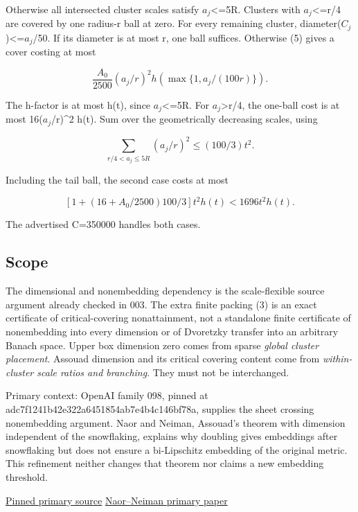\documentclass[
  11pt,
]{article}
\theoremstyle{remark}\newtheorem{remark}[theorem]{Remark}
\begin{document}
Otherwise all intersected cluster scales satisfy \(a_j\)\textless=5R.
Clusters with \(a_j\)\textless=r/4 are covered by one radius-r ball at
zero. For every remaining cluster,
diameter(\(C_j\))\textless=\(a_j\)/50. If its diameter is at most r, one
ball suffices. Otherwise (5) gives a cover costing at most

\[
\frac{A_0}{2500}(a_j/r)^2h(\max\{1,a_j/(100r)\}).
\]

The h-factor is at most h(t), since \(a_j\)\textless=5R. For
\(a_j\)\textgreater r/4, the one-ball cost is at most 16(\(a_j\)/r)\^{}2
h(t). Sum over the geometrically decreasing scales, using

\[
\sum_{r/4<a_j\le5R}(a_j/r)^2\le(100/3)t^2.
\]

Including the tail ball, the second case costs at most

\[
[1+(16+A_0/2500)100/3]t^2h(t)<1696t^2h(t).
\]

The advertised C=350000 handles both cases.

\subsection{Scope}\label{scope}

The dimensional and nonembedding dependency is the scale-flexible source
argument already checked in 003. The extra finite packing (3) is an
exact certificate of critical-covering nonattainment, not a standalone
finite certificate of nonembedding into every dimension or of Dvoretzky
transfer into an arbitrary Banach space. Upper box dimension zero comes
from sparse \emph{global cluster placement}. Assouad dimension and its
critical covering content come from \emph{within-cluster scale ratios
and branching}. They must not be interchanged.

Primary context: OpenAI family 098, pinned at
adc7f1241b42e322a6451854ab7e4b4c146bf78a, supplies the sheet crossing
nonembedding argument. Naor and Neiman, Assouad's theorem with dimension
independent of the snowflaking, explains why doubling gives embeddings
after snowflaking but does not ensure a bi-Lipschitz embedding of the
original metric. This refinement neither changes that theorem nor claims
a new embedding threshold.

\href{https://github.com/openai/math/blob/adc7f1241b42e322a6451854ab7e4b4c146bf78a/preprints/A-doubling-Hilbert-subset-with-no-finite-dimensional-bi-Lipschitz-embedding-September-25-2026/build/main.tex}{Pinned
primary source}
\href{https://web.math.princeton.edu/~naor/homepage\%20files/assouad-N\%28K\%29.pdf}{Naor--Neiman
primary paper}
\end{document}
